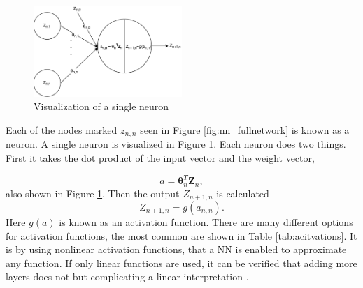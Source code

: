         
        \begin{figure}[h]
            \centering
            \includegraphics[width=0.5\textwidth]{report/figures/techniques/single_neuron.pdf}
            \caption{Visualization of a single neuron}
            \label{fig:nn_neuron}
        \end{figure}
        
        Each of the nodes marked  $z_{n,n}$ seen in Figure \ref{fig:nn_fullnetwork} is known as a neuron. A single neuron is visualized in Figure \ref{fig:nn_neuron}. Each neuron does two things. First it takes the dot product of the input vector and the weight vector, 
        
        \begin{equation}
            a = \bm \theta_n^T \bm Z_n,
            \label{eq:neuron_a}
        \end{equation}
        also shown in Figure \ref{fig:nn_neuron}. Then the output $Z_{n+1,n}$ is calculated 
        \begin{equation}
            Z_{n+1,n} = g(a_{n,n}).
            \label{eq:nn_activation}
        \end{equation}
        Here $g(a)$ is known as an activation function. There are many different options for activation functions, the most common are shown in Table \ref{tab:acitvations}. It is by using nonlinear activation functions, that a NN is enabled to approximate any function. If only linear functions are used, it can be verified that adding more layers does not but complicating a linear interpretation \cite{Hastie}. 
        
        
        
